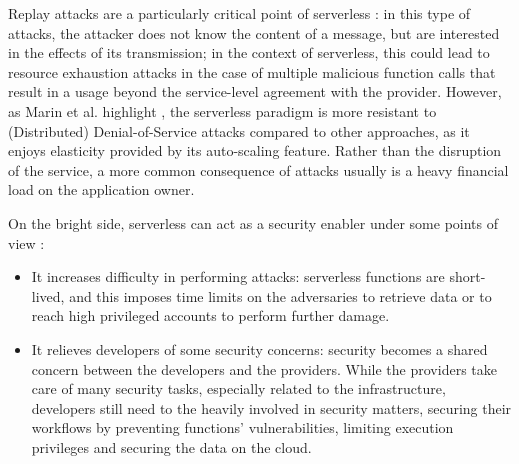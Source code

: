 \documentclass[
	a4paper, %
	12pt,
	twoside, %
]{LTJournalArticle}
\begin{document}
Replay attacks are a particularly critical point of serverless \cite{shafiei_serverless_2022}: in this type of attacks, the attacker does not know the content of a message, but are interested in the effects of its transmission; in the context of serverless, this could lead to resource exhaustion attacks in the case of multiple malicious function calls that result in a usage beyond the service-level agreement with the provider. However, as Marin et al. highlight \cite{marin_serverless_2022}, the serverless paradigm is more resistant to (Distributed) Denial-of-Service attacks compared to other approaches, as it enjoys elasticity provided by its auto-scaling feature. Rather than the disruption of the service, a more common consequence of attacks usually is a heavy financial load on the application owner. 

On the bright side, serverless can act as a security enabler under some points of view \cite{marin_serverless_2022}:

\begin{itemize}
	\item It increases difficulty in performing attacks: serverless functions are short-lived, and this imposes time limits on the adversaries to retrieve data or to reach high privileged accounts to perform further damage.
	\item It relieves developers of some security concerns: security becomes a shared concern between the developers and the providers. While the providers take care of many security tasks, especially related to the infrastructure, developers still need to the heavily involved in security matters, securing their workflows by preventing functions' vulnerabilities, limiting execution privileges and securing the data on the cloud. 
\end{itemize}
\end{document}

